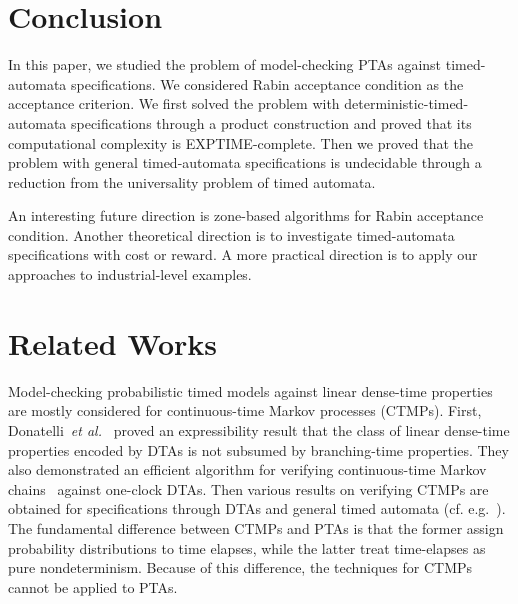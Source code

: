 \section{Conclusion}

In this paper, we studied the problem of model-checking PTAs against timed-automata specifications.
We considered Rabin acceptance condition as the acceptance criterion.
We first solved the problem with deterministic-timed-automata specifications through a product construction and proved that its computational complexity is EXPTIME-complete.
Then we proved that the problem with general timed-automata specifications is undecidable through a reduction from the universality problem of timed automata.

An interesting future direction is zone-based algorithms for Rabin acceptance condition.
Another theoretical direction is to investigate timed-automata specifications with cost or reward.
A more practical direction is to apply our approaches to industrial-level examples.

\section{Related Works}

Model-checking probabilistic timed models against linear dense-time properties
are mostly considered for continuous-time Markov processes (CTMPs).
First, Donatelli~\emph{et al.}~\cite{DBLP:journals/tse/DonatelliHS09} proved an expressibility result that the class of linear dense-time properties encoded by DTAs is not subsumed by branching-time properties.
They also demonstrated an efficient algorithm for verifying continuous-time Markov chains~\cite{DBLP:journals/tse/DonatelliHS09} against one-clock DTAs.
Then various results on verifying CTMPs are obtained for specifications through DTAs and general timed automata (cf. e.g.~\cite{DBLP:journals/tse/DonatelliHS09,DBLP:journals/corr/abs-1101-3694,DBLP:conf/hybrid/Fu13,DBLP:conf/hybrid/BrazdilKKKR11,DBLP:conf/tacas/BarbotCHKM11,DBLP:conf/formats/BortolussiL15}).
The fundamental difference between CTMPs and PTAs is that the former assign probability distributions to time elapses, while the latter treat time-elapses as pure nondeterminism.
Because of this difference, the techniques for CTMPs cannot be applied to PTAs.

